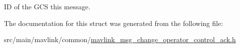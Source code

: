 I\+D of the G\+C\+S this message. 



The documentation for this struct was generated from the following file\+:\begin{DoxyCompactItemize}
\item 
src/main/mavlink/common/\hyperlink{mavlink__msg__change__operator__control__ack_8h}{mavlink\+\_\+msg\+\_\+change\+\_\+operator\+\_\+control\+\_\+ack.\+h}\end{DoxyCompactItemize}
